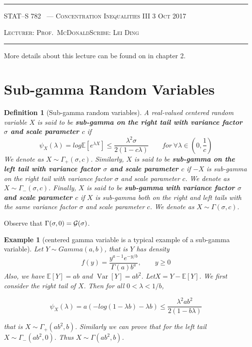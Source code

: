 \documentclass[10pt]{article}
\newcounter{lecnum}
\newtheorem{definition}[def]{Definition}
\newtheorem{example}[ex]{Example}
\newcommand{\Expect}[1]{\mathbb{E}\!\left[#1\right]}
\DeclareMathOperator*{\Variance}{Var}
\newcommand{\Var}[1]{\Variance\!\left[#1\right]}
\newcommand{\lecturer}{Prof.\ McDonald}
\newcommand{\scribe}{Lei Ding}
\newcommand{\chtitle}{Concentration Inequalities III}
\newcommand{\lecdate}{3 Oct 2017}
\begin{document}
\rule{6.5in}{1pt}

\textsc{STAT--S 782
        \hfill \thelecnum\ --- \chtitle
        \hfill \lecdate}

\textsc{Lecturer: \lecturer \hfill Scribe: \scribe}
\rule{6.5in}{1pt}

More details about this lecture can be found on \cite{BoucheronLugosi2013} in chapter 2.


\section{Sub-gamma Random Variables}

\begin{definition}[Sub-gamma random variables]
A real-valued centered random variable $X$ is said to be \textbf{sub-gamma on the right tail 
with variance factor $\sigma$ and scale parameter $c$} if 
\begin{equation}
\psi_X(\lambda) = log \Expect{e^{\lambda X}} \le \frac{\lambda^2 \sigma}{2(1-c \lambda)} 
\qquad for \ \forall \lambda \in (0, \frac{1}{c})
\end{equation}
We denote as $X \sim \Gamma _{+}(\sigma, c)$.
Similarly, $X$ is said to be \textbf{sub-gamma on the left tail with variance factor 
$\sigma$ and scale parameter $c$} if $-X$ is sub-gamma on the right tail 
with variance factor $\sigma$ and scale parameter $c$.
We denote as $X \sim \Gamma _{-}(\sigma, c)$.
Finally, $X$ is said to be \textbf{sub-gamma
with variance factor $\sigma$ and scale parameter $c$} if
$X$ is sub-gamma both on the right and left tails with the same variance factor $\sigma$
and scale parameter $c$.
We denote as $X \sim \Gamma(\sigma, c)$.
\end{definition}

Observe that $\Gamma(\sigma, 0) = \cal{G}(\sigma)$.


\begin{example}[centered gamma variable is a typical example of a sub-gamma variable]
Let $Y \sim Gamma(a, b)$, that is $Y$ has density
\begin{equation}
f(y) = \frac{y^{a-1}e^{-y/b}}{\Gamma(a)b^a} , \qquad y \ge 0
\end{equation}
Also, we have $\Expect{Y} = ab$ and $\Var{Y} = ab^2$. 
Let$X = Y -\Expect{Y}$. We first consider the right tail of $X$.
Then for all $0 < \lambda < 1/b$,

\begin{equation}
\psi_X(\lambda) = a (- log(1 - \lambda b) - \lambda b) \le \frac{\lambda^2ab^2}{2(1-b\lambda)}
\end{equation}

that is $X \sim \Gamma _{+}(ab^2, b)$. Similarly we can prove that for the left tail
$X \sim \Gamma _{-}(ab^2, 0)$. Thus $X \sim \Gamma (ab^2, b)$.

\end{example}
\end{document}
